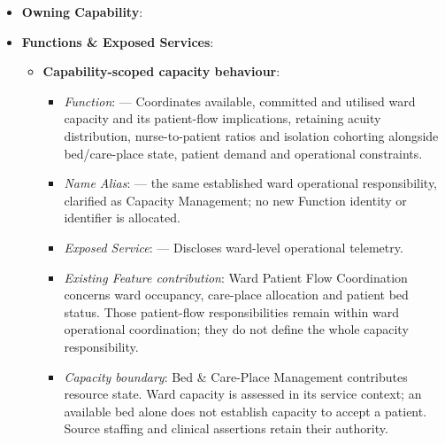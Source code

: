 \begin{itemize}

\item 
\textbf{Owning Capability}: \texttt{}



\item 
\textbf{Functions \& Exposed Services}:


\begin{itemize}

\item 
\textbf{Capability-scoped capacity behaviour}:


\begin{itemize}

\item 
\emph{Function}: \texttt{} — Coordinates available, committed and utilised ward capacity and its patient-flow implications, retaining acuity distribution, nurse-to-patient ratios and isolation cohorting alongside bed/\allowbreak{}care-place state, patient demand and operational constraints.



\item 
\emph{Name Alias}: \texttt{} — the same established ward operational responsibility, clarified as Capacity Management; no new Function identity or identifier is allocated.



\item 
\emph{Exposed Service}: \texttt{} — Discloses ward-level operational telemetry.



\item 
\emph{Existing Feature contribution}: Ward Patient Flow Coordination concerns ward occupancy, care-place allocation and patient bed status. Those patient-flow responsibilities remain within ward operational coordination; they do not define the whole capacity responsibility.



\item 
\emph{Capacity boundary}: Bed \& Care-Place Management contributes resource state. Ward capacity is assessed in its service context; an available bed alone does not establish capacity to accept a patient. Source staffing and clinical assertions retain their authority.




\end{itemize}
\end{itemize}
\end{itemize}
